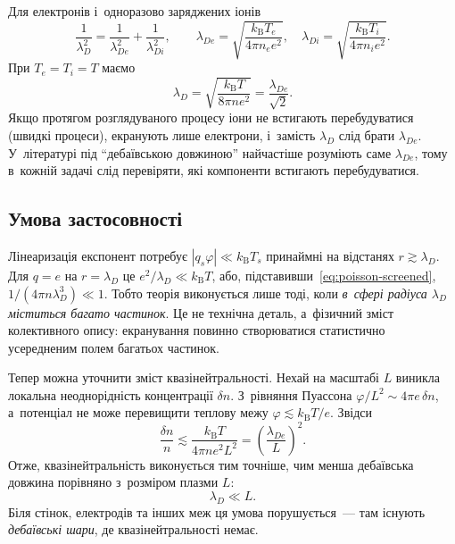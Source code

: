 Для електронів і~одноразово заряджених іонів
\begin{equation*}
	\frac1{\lambda_D^2}=\frac1{\lambda_{De}^2}+\frac1{\lambda_{Di}^2},
	\qquad
	\lambda_{De}=\sqrt{\frac{k_{\mathrm B}T_e}{4\pi n_ee^2}},
	\quad
	\lambda_{Di}=\sqrt{\frac{k_{\mathrm B}T_i}{4\pi n_ie^2}}.
\end{equation*}
При $T_e=T_i=T$ маємо
\begin{equation}\label{eq:debye-radius}
	\lambda_D=\sqrt{\frac{k_{\mathrm B}T}{8\pi ne^2}}=\frac{\lambda_{De}}{\sqrt2}.
\end{equation}
Якщо протягом розглядуваного процесу іони не встигають перебудуватися (швидкі процеси),
екранують лише електрони, і~замість $\lambda_D$ слід брати $\lambda_{De}$. У~літературі
під \enquote{дебаївською довжиною} найчастіше розуміють саме $\lambda_{De}$, тому в~кожній
задачі слід перевіряти, які компоненти встигають перебудуватися.



\subsection{Умова застосовності}



Лінеаризація експонент потребує $|q_s\varphi|\ll k_{\mathrm B}T_s$ принаймні на відстанях
$r\gtrsim\lambda_D$. Для $q=e$ на $r=\lambda_D$ це $e^2/\lambda_D\ll k_{\mathrm B}T$, або,
підставивши~\eqref{eq:poisson-screened}, $1/(4\pi n\lambda_D^3)\ll1$. Тобто теорія
виконується лише тоді, коли \emph{в~сфері радіуса $\lambda_D$ міститься багато частинок}.
Це не технічна деталь, а~фізичний зміст колективного опису: екранування повинно
створюватися статистично усередненим полем багатьох частинок.

Тепер можна уточнити зміст квазінейтральності. Нехай на масштабі $L$ виникла локальна
неоднорідність концентрації $\delta n$. З~рівняння Пуассона $\varphi/L^2\sim4\pi e\,\delta
n$, а~потенціал не може перевищити теплову межу $\varphi\lesssim k_{\mathrm B}T/e$. Звідси
\begin{equation*}
	\frac{\delta n}n\lesssim\frac{k_{\mathrm B}T}{4\pi ne^2L^2}=\left(\frac{\lambda_{De}}L\right)^2.
\end{equation*}
Отже, квазінейтральність виконується тим точніше, чим менша дебаївська довжина порівняно
з~розміром плазми $L$:
\begin{equation}\label{eq:size-condition}
	\lambda_D\ll L.
\end{equation}
Біля стінок, електродів та інших меж ця умова порушується~--- там існують \emph{дебаївські
шари}, де квазінейтральності немає.



